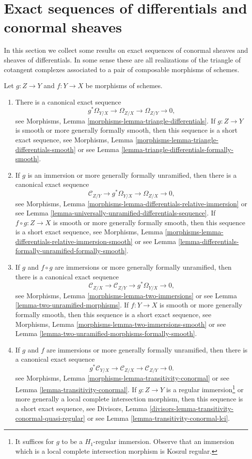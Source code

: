 \section{Exact sequences of differentials and conormal sheaves}
\label{section-exact}

\noindent
In this section we collect some results on exact sequences of conormal
sheaves and sheaves of differentials. In some sense these are all
realizations of the triangle of cotangent complexes associated to a pair of
composable morphisms of schemes.

\medskip\noindent
Let $g : Z \to Y$ and $f : Y \to X$ be morphisms of schemes.
\begin{enumerate}
\item There is a canonical exact sequence
$$
g^*\Omega_{Y/X} \to \Omega_{Z/X} \to \Omega_{Z/Y} \to 0,
$$
see
Morphisms, Lemma \ref{morphisms-lemma-triangle-differentials}.
If $g : Z \to Y$ is smooth or more generally formally smooth, then this
sequence is a short exact sequence, see
Morphisms, Lemma \ref{morphisms-lemma-triangle-differentials-smooth}
or see Lemma \ref{lemma-triangle-differentials-formally-smooth}.
\item If $g$ is an immersion or more generally formally unramified,
then there is a canonical exact sequence
$$
\mathcal{C}_{Z/Y} \to g^*\Omega_{Y/X} \to \Omega_{Z/X} \to 0,
$$
see Morphisms, Lemma \ref{morphisms-lemma-differentials-relative-immersion}
or see Lemma \ref{lemma-universally-unramified-differentials-sequence}.
If $f \circ g : Z \to X$ is smooth or more generally formally smooth, then this
sequence is a short exact sequence, see
Morphisms, Lemma \ref{morphisms-lemma-differentials-relative-immersion-smooth}
or see Lemma \ref{lemma-differentials-formally-unramified-formally-smooth}.
\item If $g$ and $f \circ g$ are immersions or more generally
formally unramified, then there is a canonical exact sequence
$$
\mathcal{C}_{Z/X} \to \mathcal{C}_{Z/Y} \to g^*\Omega_{Y/X} \to 0,
$$
see
Morphisms, Lemma \ref{morphisms-lemma-two-immersions} or see
Lemma \ref{lemma-two-unramified-morphisms}. If $f : Y \to X$ is smooth or
more generally formally smooth, then this sequence is a short exact sequence,
see Morphisms, Lemma \ref{morphisms-lemma-two-immersions-smooth} or see
Lemma \ref{lemma-two-unramified-morphisms-formally-smooth}.
\item If $g$ and $f$ are immersions or more generally formally unramified, then
there is a canonical exact sequence
$$
g^*\mathcal{C}_{Y/X} \to \mathcal{C}_{Z/X} \to \mathcal{C}_{Z/Y} \to 0.
$$
see
Morphisms, Lemma \ref{morphisms-lemma-transitivity-conormal} or see
Lemma \ref{lemma-transitivity-conormal}.
If $g : Z \to Y$ is a regular immersion\footnote{It suffices for $g$ to be
a $H_1$-regular immersion. Observe that an immersion which is a
local complete intersection morphism is Koszul regular.} or
more generally a local complete intersection morphism, then this
sequence is a short exact sequence, see
Divisors, Lemma \ref{divisors-lemma-transitivity-conormal-quasi-regular}
or see Lemma \ref{lemma-transitivity-conormal-lci}.
\end{enumerate}
